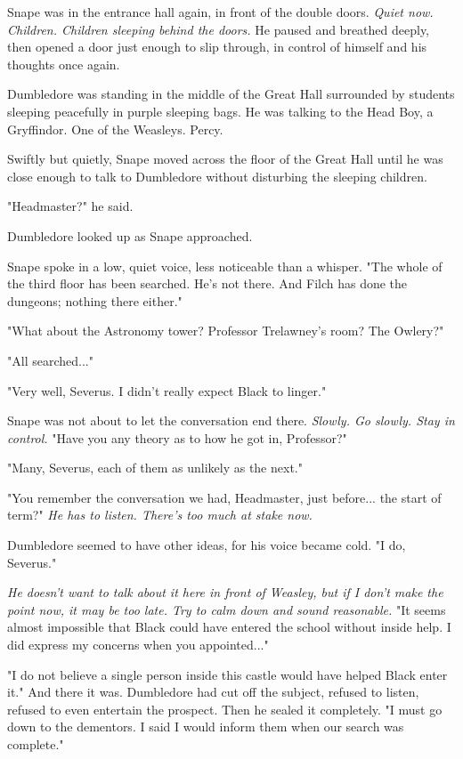 Snape was in the entrance hall again, in front of the double doors. \emph{Quiet now. Children. Children sleeping behind the doors.} He paused and breathed deeply, then opened a door just enough to slip through, in control of himself and his thoughts once again.

Dumbledore was standing in the middle of the Great Hall surrounded by students sleeping peacefully in purple sleeping bags. He was talking to the Head Boy, a Gryffindor. One of the Weasleys. Percy.

Swiftly but quietly, Snape moved across the floor of the Great Hall until he was close enough to talk to Dumbledore without disturbing the sleeping children.

"Headmaster?" he said.

Dumbledore looked up as Snape approached.

Snape spoke in a low, quiet voice, less noticeable than a whisper. "The whole of the third floor has been searched. He's not there. And Filch has done the dungeons; nothing there either."

"What about the Astronomy tower? Professor Trelawney's room? The Owlery?"

"All searched..."

"Very well, Severus. I didn't really expect Black to linger."

Snape was not about to let the conversation end there. \emph{Slowly. Go slowly. Stay in control.} "Have you any theory as to how he got in, Professor?"

"Many, Severus, each of them as unlikely as the next."

"You remember the conversation we had, Headmaster, just before... the start of term?" \emph{He has to listen. There's too much at stake now.}

Dumbledore seemed to have other ideas, for his voice became cold. "I do, Severus."

\emph{He doesn't want to talk about it here in front of Weasley, but if I don't make the point now, it may be too late. Try to calm down and sound reasonable.} "It seems almost impossible that Black could have entered the school without inside help. I did express my concerns when you appointed..."

"I do not believe a single person inside this castle would have helped Black enter it." And there it was. Dumbledore had cut off the subject, refused to listen, refused to even entertain the prospect. Then he sealed it completely. "I must go down to the dementors. I said I would inform them when our search was complete."

